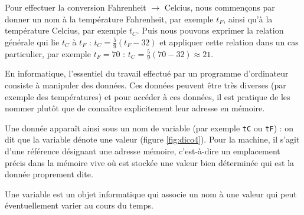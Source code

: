 \noindent Pour effectuer la conversion Fahrenheit $\rightarrow$ Celcius, nous commençons par donner un
nom à la température Fahrenheit, par exemple {$t_F$}, ainsi qu'à la température Celcius,
par exemple {$t_C$}. Puis nous pouvons exprimer la relation générale qui lie {$t_C$} à {$t_F$} :
{$\displaystyle t_C = \frac{5}{9}(t_F - 32)$} et appliquer cette relation
dans un cas particulier, par exemple $t_F = 70$ : $\displaystyle t_C = \frac{5}{9}(70 - 32) \approx 21$.

En informatique, l'essentiel du travail effectué par un programme d'ordinateur consiste 
à manipuler des données. Ces données peuvent être très diverses (par exemple des températures) et
pour accéder à ces données, il est pratique de les nommer plutôt que de connaître
explicitement leur adresse en mémoire. 

Une donnée apparaît ainsi sous un nom de variable (par exemple {\tt tC} ou {\tt tF}) :
on dit que la variable dénote une valeur (figure \ref{fig:dico4}).
Pour la machine, il s'agit d'une référence 
désignant une adresse mémoire, c'est-à-dire un emplacement précis dans la mémoire vive où est
stockée une valeur bien déterminée qui est la donnée proprement dite.

\begin{defin}[variable]
Une variable est un objet informatique qui associe un nom à une valeur 
qui peut éventuellement varier au cours du temps.
\end{defin}

